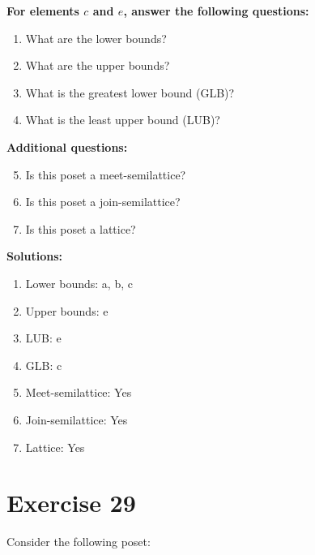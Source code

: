 \documentclass{article}
\begin{document}
    \textbf{For elements $c$ and $e$, answer the following questions:}
\begin{enumerate}
    \item What are the lower bounds?
    \item What are the upper bounds?
    \item What is the greatest lower bound (GLB)?
    \item What is the least upper bound (LUB)?
\end{enumerate}
    \hspace*{3ex} \textbf{Additional questions:}
\begin{enumerate}
    \setcounter{enumi}{4}
    \item Is this poset a meet-semilattice?
    \item Is this poset a join-semilattice?
    \item Is this poset a lattice?
\end{enumerate}

\textbf{Solutions:}
\begin{enumerate}
    \item Lower bounds: {a, b, c}
    \item Upper bounds: {e}
    \item LUB: e
    \item GLB: c
    \item Meet-semilattice: Yes
    \item Join-semilattice: Yes
    \item Lattice: Yes
\end{enumerate}
\newpage
\section*{Exercise 29}
Consider the following poset:
\begin{center}
\end{center}
\end{document}

